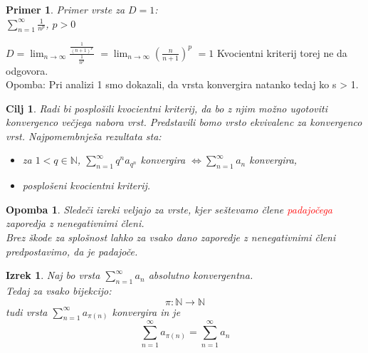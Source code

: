 \documentclass{beamer}
\newtheorem{izrek}{Izrek}
\newtheorem{cilj}{Cilj}
\newtheorem{opomba}{Opomba}
\newtheorem{primer}{Primer}
\def\N{\mathbb{N}} %
\begin{document}
\begin{frame}
    \begin{primer}{Primer vrste za $D = 1$}: \\
       $\sum_{n = 1}^{\infty}{\frac{1}{n^p}}$, $p > 0$
    \end{primer}
    
    \vspace{\baselineskip}
    \pause
    $D = \lim_{n \to \infty} \frac{\frac{1}{(n+1)^p}}{\frac{1}{n^p}}$
    $= \lim_{n \to \infty} (\frac{n}{n + 1})^p$ 
    $= 1$
    \pause
    \vspace{\baselineskip}
    Kvocientni kriterij torej ne da odgovora.\\
    Opomba: Pri analizi 1 smo dokazali, da vrsta konvergira natanko tedaj ko s > 1.
\end{frame}
\begin{frame}
    \begin{cilj}
        Radi bi posplošili \emph{kvocientni kriterij}, da bo z njim možno ugotoviti konvergenco večjega nabora vrst.
        Predstavili bomo vrsto ekvivalenc za konvergenco vrst. Najpomembnješa rezultata sta:
        \begin{itemize}
            \item za $ 1 < q \in {\mathbb{N}}$, $\sum_{n = 1}^{\infty}{q^na_{q^n}}$ konvergira $\iff \sum_{n = 1}^{\infty}{a_{n}}$ konvergira, \\
            \item posplošeni kvocientni kriterij.
        \end{itemize} 
    \end{cilj}
\end{frame}

\begin{frame}
    \begin{opomba}
        Sledeči izreki veljajo za vrste, kjer seštevamo člene \textcolor{red}{padajočega} zaporedja z nenegativnimi členi.\\
        Brez škode za splošnost lahko za vsako dano zaporedje z nenegativnimi členi predpostavimo, da je padajoče.
        
    \end{opomba}

    \pause
    \begin{izrek}
        Naj bo vrsta $\sum_{n = 1}^{\infty}{a_n}$ absolutno konvergentna.\\
        Tedaj za vsako bijekcijo:
        \[
            \pi: \N \rightarrow \N 
        \]
        tudi vrsta $\sum_{n = 1}^{\infty}{a_{\pi(n)}}$ konvergira in je 
        \[
            \sum_{n = 1}^{\infty}{a_{\pi(n)}} = \sum_{n = 1}^{\infty}{a_n}
        \]
    \end{izrek}
\end{frame}
\end{document}
